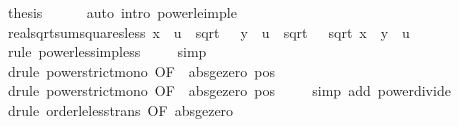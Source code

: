 \begin{isabellebody}
\ {\isacharquery}{\kern0pt}thesis\isanewline
\ \ \ \ \isamarkupfalse%
\ {\isacharparenleft}{\kern0pt}auto\ intro{\isacharcolon}{\kern0pt}\ power{}{\isacharunderscore}{\kern0pt}le{\isacharunderscore}{\kern0pt}imp{\isacharunderscore}{\kern0pt}le{\isacharparenright}{\kern0pt}\isanewline
{}\isamarkupfalse%
%
\endisatagproof
{\isafoldproof}%
%
\isadelimproof
\isanewline
%
\endisadelimproof
\isanewline
{}\isamarkupfalse%
\ real{\isacharunderscore}{\kern0pt}sqrt{\isacharunderscore}{\kern0pt}sum{\isacharunderscore}{\kern0pt}squares{\isacharunderscore}{\kern0pt}less{\isacharcolon}{\kern0pt}\ {\isachardoublequoteopen}{\isasymbar}x{\isasymbar}\ {\isacharless}{\kern0pt}\ u\ {\isacharslash}{\kern0pt}\ sqrt\ {}\ {\isasymLongrightarrow}\ {\isasymbar}y{\isasymbar}\ {\isacharless}{\kern0pt}\ u\ {\isacharslash}{\kern0pt}\ sqrt\ {}\ {\isasymLongrightarrow}\ sqrt\ {\isacharparenleft}{\kern0pt}x\ {\isacharplus}{\kern0pt}\ y\ {\isacharless}{\kern0pt}\ u{\isachardoublequoteclose}\isanewline
%
\isadelimproof
\ \ %
\endisadelimproof
%
\isatagproof
{}\isamarkupfalse%
\ {\isacharparenleft}{\kern0pt}rule\ power{}{\isacharunderscore}{\kern0pt}less{\isacharunderscore}{\kern0pt}imp{\isacharunderscore}{\kern0pt}less{\isacharparenright}{\kern0pt}\isanewline
\ \ \ \isamarkupfalse%
\ simp\isanewline
\ \ \ \isamarkupfalse%
\ {\isacharparenleft}{\kern0pt}drule\ power{\isacharunderscore}{\kern0pt}strict{\isacharunderscore}{\kern0pt}mono\ {\isacharbrackleft}{\kern0pt}OF\ {\isacharunderscore}{\kern0pt}\ abs{\isacharunderscore}{\kern0pt}ge{\isacharunderscore}{\kern0pt}zero\ pos{}{\isacharbrackright}{\kern0pt}{\isacharparenright}{\kern0pt}\isanewline
\ \ \ \isamarkupfalse%
\ {\isacharparenleft}{\kern0pt}drule\ power{\isacharunderscore}{\kern0pt}strict{\isacharunderscore}{\kern0pt}mono\ {\isacharbrackleft}{\kern0pt}OF\ {\isacharunderscore}{\kern0pt}\ abs{\isacharunderscore}{\kern0pt}ge{\isacharunderscore}{\kern0pt}zero\ pos{}{\isacharbrackright}{\kern0pt}{\isacharparenright}{\kern0pt}\isanewline
\ \ \ \isamarkupfalse%
\ {\isacharparenleft}{\kern0pt}simp\ add{\isacharcolon}{\kern0pt}\ power{\isacharunderscore}{\kern0pt}divide{\isacharparenright}{\kern0pt}\isanewline
\ \ \isamarkupfalse%
\ {\isacharparenleft}{\kern0pt}drule\ order{\isacharunderscore}{\kern0pt}le{\isacharunderscore}{\kern0pt}less{\isacharunderscore}{\kern0pt}trans\ {\isacharbrackleft}{\kern0pt}OF\ abs{\isacharunderscore}{\kern0pt}ge{\isacharunderscore}{\kern0pt}zero{\isacharbrackright}{\kern0pt}{\isacharparenright}{\kern0pt}\isanewline

\end{isabellebody}
